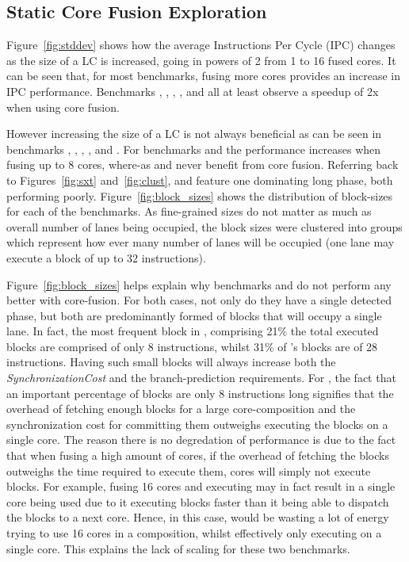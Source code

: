 \subsection{Static Core Fusion Exploration}

Figure~\ref{fig:stddev} shows how the average Instructions Per Cycle (IPC) changes as the size of a LC is increased, going in powers of 2 from 1 to 16 fused cores.
It can be seen that, for most benchmarks, fusing more cores provides an increase in IPC performance.
Benchmarks , , , ,  and  all at least observe a speedup of 2x when using core fusion.

However increasing the size of a LC is not always beneficial as can be seen in benchmarks , , , , and .
For benchmarks  and  the performance increases when fusing up to 8 cores, where-as  and  never benefit from core fusion. 
Referring back to Figures~\ref{fig:sxt} and~\ref{fig:clust},  and  feature one dominating long phase, both performing poorly.
Figure~\ref{fig:block_sizes} shows the distribution of block-sizes for each of the benchmarks.
As fine-grained sizes do not matter as much as overall number of lanes being occupied, the block sizes were clustered into groups which represent how ever many number of lanes will be occupied (one lane may execute a block of up to 32 instructions).

Figure~\ref{fig:block_sizes} helps explain why benchmarks  and  do not perform any better with core-fusion.
For both cases, not only do they have a single detected phase, but both are predominantly formed of blocks that will occupy a single lane.
In fact, the most frequent block in , comprising 21\% the total executed blocks are comprised of only 8 instructions, whilst 31\% of 's blocks are of 28 instructions.
Having such small blocks will always increase both the \textit{SynchronizationCost} and the branch-prediction requirements.
For , the fact that an important percentage of blocks are only 8 instructions long signifies that the overhead of fetching enough blocks for a large core-composition and the synchronization cost for committing them outweighs executing the blocks on a single core.
The reason there is no degredation of performance is due to the fact that when fusing a high amount of cores, if the overhead of fetching the blocks outweighs the time required to execute them, cores will simply not execute blocks.
For example, fusing 16 cores and executing  may in fact result in a single core being used due to it executing blocks faster than it being able to dispatch the blocks to a next core.
Hence, in this case,  would be wasting a lot of energy trying to use 16 cores in a composition, whilst effectively only executing on a single core. 
This explains the lack of scaling for these two benchmarks.

